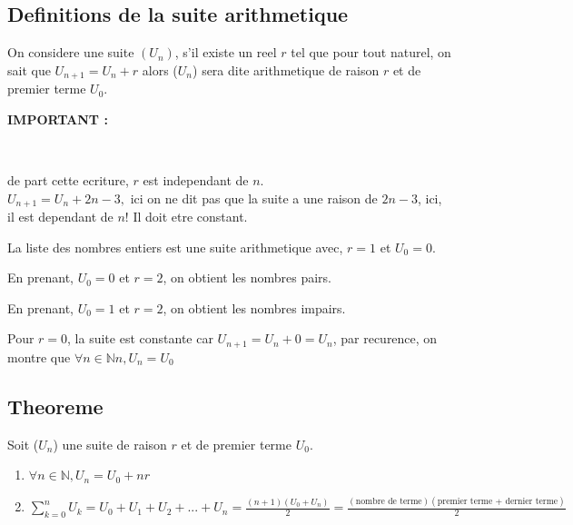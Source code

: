 \documentclass[a4paper,10pt]{book}
\begin{document}
				\subsection{Definitions de la suite arithmetique}

			\begin{Def}
				On considere une suite $(U_n)$, s'il existe un reel $r$ tel que pour tout naturel, on sait que $U_{n+1} = U_n + r$ alors ($U_n$) sera dite arithmetique de raison $r$ et de premier terme $U_0$.
			\end{Def}

			\medskip

			\textbf{IMPORTANT :\\}

			\medskip\\

			\begin{rem}
				de part cette ecriture, $r$ est independant de $n$.\\
				$U_{n+1} = U_n + 2n - 3,$ ici on ne dit pas que la suite a une raison de $2n-3$, ici, \\il est dependant de $n$! Il doit etre constant.
			\end{rem}

			\exemple
				\begin{description}
					\item La liste des nombres entiers est une suite arithmetique avec, $r=1$ et $U_0 = 0$.
					\item En prenant, $U_0 = 0$ et $r = 2$, on obtient les nombres pairs.
					\item En prenant, $U_0 = 1$ et $r = 2$, on obtient les nombres impairs.
					\item Pour $r = 0$, la suite est constante car $U_{n+1} = U_n + 0 = U_n$, par recurence, on montre que $\forall n \in \mathbb{N}n, U_n = U_0$
				\end{description}

			\subsection{Theoreme}

			\begin{prop}
				Soit ($U_n$) une suite de raison $r$ et de premier terme $U_0$.
				\begin{enumerate}
					\item $\forall n \in \mathbb{N}, U_n = U_0 + nr$
					\item $\sum_{k = 0}^{n} U_k = U_0 + U_1 + U_2 + ... + U_n = \frac{(n+1)(U_0 + U_n)}{2} = \frac{(\text{nombre de terme})(\text{premier terme + dernier terme})}{2}$
				\end{enumerate}
			\end{prop}
\end{document}

